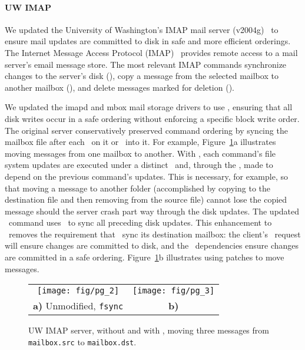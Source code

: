 \paragraph{UW IMAP}
\label{sec:patchgroup:uwimap}

We updated the University of Washington's IMAP mail server
(v2004g)~\cite{uwimap} to ensure mail updates are committed to disk
in safe and more efficient orderings.
%
The Internet Message Access Protocol (IMAP)~\cite{rfc3501} provides
remote access to a mail server's email message store.
%
The most relevant IMAP commands synchronize changes to the server's
disk (\imapCheck), copy a message from the selected mailbox to another
mailbox (\imapCopy), and delete messages marked for deletion (\imapExpunge).

We updated the imapd and mbox mail storage drivers to use
\patchgroups, ensuring that all disk writes occur in a safe ordering
without enforcing a specific block write order.
%
The original server conservatively preserved command ordering by
syncing the mailbox file after each \imapCheck\ on it or \imapCopy\ into it.
%
For example, Figure~\ref{fig:imap}a illustrates moving messages from
one mailbox to another.
%
With \patchgroups, each command's file system updates are executed under a
distinct \patchgroup\ and, through the \patchgroup, made to depend on the
previous command's updates. This is necessary, for example, so that
moving a message to another folder (accomplished by copying to the
destination file and then removing from the source file) cannot lose
the copied message should the server crash part way through the disk
updates.
%
The updated \imapCheck\ command uses \pgSync\ to sync all preceding disk
updates. This enhancement to \imapCheck\ removes the requirement that \imapCopy\
sync its destination mailbox: the client's \imapCheck\ request will ensure
changes are committed to disk, and the \patchgroup\ dependencies ensure
changes are committed in a safe ordering.
%
Figure~\ref{fig:imap}b illustrates using patches to move messages.

\begin{figure}[tb]
\centering
\begin{tabular}{@{}cc@{}}
\texttt{[image: fig/pg\_2]} & 
\texttt{[image: fig/pg\_3]}\\
\textbf{a)} Unmodified, \texttt{fsync} & 
\textbf{b)} \Patchgroups
\end{tabular}
\caption{UW IMAP server, without and with \patchgroups, moving three
messages from \texttt{mailbox.src} to \texttt{mailbox.dst}.}
\label{fig:imap}
\end{figure}

